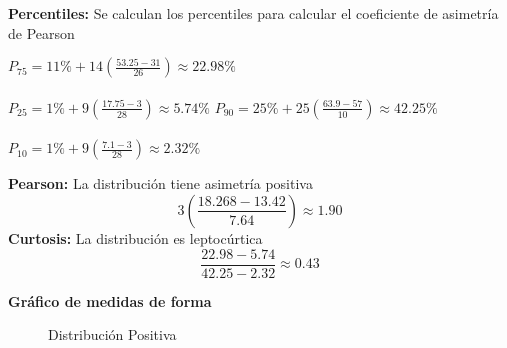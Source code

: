 \noindent\textbf{Percentiles:} Se calculan los percentiles para calcular el coeficiente de asimetría de Pearson

\begin{multicols}{2}
	\noindent$P_{75} = 11\% + 14\left(\frac{53.25 - 31}{26}\right) \approx 22.98\%$ \\ \\
	$P_{25} = 1\% + 9\left(\frac{17.75 - 3}{28}\right) \approx 5.74\%$
	\columnbreak
	\vfill
	\noindent$P_{90} = 25\% + 25\left(\frac{63.9 - 57}{10}\right) \approx 42.25\%$ \\ \\
	$P_{10} = 1\% + 9\left(\frac{7.1 - 3}{28}\right) \approx 2.32\%$
\end{multicols}

\begin{multicols}{2}
	\noindent\textbf{Pearson:} La distribución tiene asimetría positiva
	\begin{equation*}
		3\left(\frac{18.268-13.42}{7.64}\right) \approx 1.90
	\end{equation*}
	\vfill
	\columnbreak
	\noindent\textbf{Curtosis:} La distribución es leptocúrtica
	\begin{equation*}
		\frac{22.98-5.74}{42.25-2.32} \approx 0.43
	\end{equation*}
\end{multicols}

\newpage

\noindent\textbf{Gráfico de medidas de forma}
\begin{figure}[h!]
	\centering
	\hspace*{-1.2cm}
	\caption{Distribución Positiva}
\end{figure}

